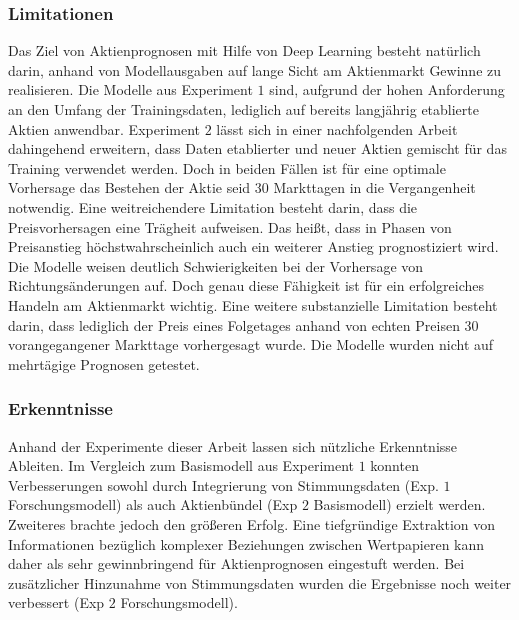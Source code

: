 \subsubsection{Limitationen}\label{sec:evaluierung_limits}
Das Ziel von Aktienprognosen mit Hilfe von Deep Learning besteht natürlich darin, anhand von Modellausgaben auf lange Sicht am Aktienmarkt Gewinne zu realisieren. Die Modelle aus Experiment $1$ sind, aufgrund der hohen Anforderung an den Umfang der Trainingsdaten, lediglich auf bereits langjährig etablierte Aktien anwendbar. Experiment $2$ lässt sich in einer nachfolgenden Arbeit dahingehend erweitern, dass Daten etablierter und neuer Aktien gemischt für das Training verwendet werden. Doch in beiden Fällen ist für eine optimale Vorhersage das Bestehen der Aktie seid 30 Markttagen in die Vergangenheit notwendig. 
Eine weitreichendere Limitation besteht darin, dass die Preisvorhersagen eine Trägheit aufweisen. Das heißt, dass in Phasen von Preisanstieg höchstwahrscheinlich auch ein weiterer Anstieg prognostiziert wird. Die Modelle weisen deutlich Schwierigkeiten bei der Vorhersage von Richtungsänderungen auf. Doch genau diese Fähigkeit ist für ein erfolgreiches Handeln am Aktienmarkt wichtig. 
Eine weitere substanzielle Limitation besteht darin, dass lediglich der Preis eines Folgetages anhand von echten Preisen 30 vorangegangener Markttage vorhergesagt wurde. Die Modelle wurden nicht auf mehrtägige Prognosen getestet.  

\subsubsection{Erkenntnisse}\label{sec:evaluierung_insights}
Anhand der Experimente dieser Arbeit lassen sich nützliche Erkenntnisse Ableiten.
Im Vergleich zum Basismodell aus Experiment $1$ konnten Verbesserungen sowohl durch Integrierung von Stimmungsdaten (Exp. $1$ Forschungsmodell) als auch Aktienbündel (Exp $2$ Basismodell) erzielt werden. Zweiteres brachte jedoch den größeren Erfolg. Eine tiefgründige Extraktion von Informationen bezüglich komplexer Beziehungen zwischen Wertpapieren kann daher als sehr gewinnbringend für Aktienprognosen eingestuft werden. 
Bei zusätzlicher Hinzunahme von Stimmungsdaten wurden die Ergebnisse noch weiter verbessert (Exp $2$ Forschungsmodell).


